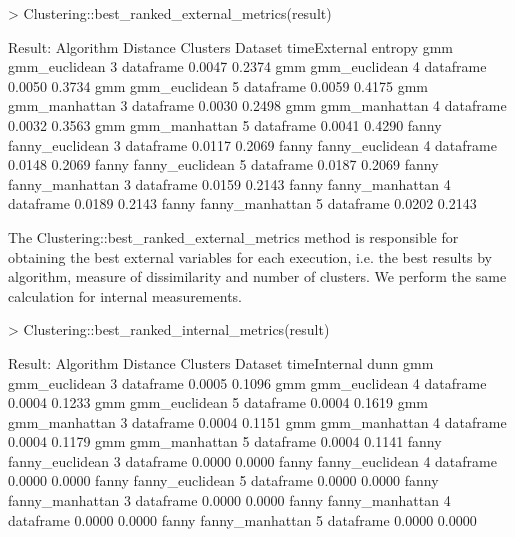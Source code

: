 \begin{Schunk}
\begin{Sinput}
> Clustering::best_ranked_external_metrics(result)
\end{Sinput}
\begin{Soutput}
Result:
Algorithm  Distance         Clusters   Dataset  timeExternal entropy
  gmm        gmm_euclidean     3      dataframe    0.0047    0.2374
  gmm        gmm_euclidean     4      dataframe    0.0050    0.3734
  gmm        gmm_euclidean     5      dataframe    0.0059    0.4175
  gmm        gmm_manhattan     3      dataframe    0.0030    0.2498
  gmm        gmm_manhattan     4      dataframe    0.0032    0.3563
  gmm        gmm_manhattan     5      dataframe    0.0041    0.4290
fanny      fanny_euclidean     3      dataframe    0.0117    0.2069
fanny      fanny_euclidean     4      dataframe    0.0148    0.2069
fanny      fanny_euclidean     5      dataframe    0.0187    0.2069
fanny      fanny_manhattan     3      dataframe    0.0159    0.2143
fanny      fanny_manhattan     4      dataframe    0.0189    0.2143
fanny      fanny_manhattan     5      dataframe    0.0202    0.2143
\end{Soutput}
\end{Schunk}

The Clustering::best\_ranked\_external\_metrics method is responsible for obtaining the best external variables for each execution, i.e. the best results by algorithm, measure of dissimilarity and number of clusters. We perform the same calculation for internal measurements.

\begin{Schunk}
\begin{Sinput}
> Clustering::best_ranked_internal_metrics(result)
\end{Sinput}
\begin{Soutput}
Result:
Algorithm      Distance     Clusters   Dataset  timeInternal   dunn
   gmm       gmm_euclidean     3      dataframe   0.0005      0.1096
   gmm       gmm_euclidean     4      dataframe   0.0004      0.1233
   gmm       gmm_euclidean     5      dataframe   0.0004      0.1619
   gmm       gmm_manhattan     3      dataframe   0.0004      0.1151
   gmm       gmm_manhattan     4      dataframe   0.0004      0.1179
   gmm       gmm_manhattan     5      dataframe   0.0004      0.1141
 fanny     fanny_euclidean     3      dataframe   0.0000      0.0000
 fanny     fanny_euclidean     4      dataframe   0.0000      0.0000
 fanny     fanny_euclidean     5      dataframe   0.0000      0.0000
 fanny     fanny_manhattan     3      dataframe   0.0000      0.0000
 fanny     fanny_manhattan     4      dataframe   0.0000      0.0000
 fanny     fanny_manhattan     5      dataframe   0.0000      0.0000
\end{Soutput}
\end{Schunk}

